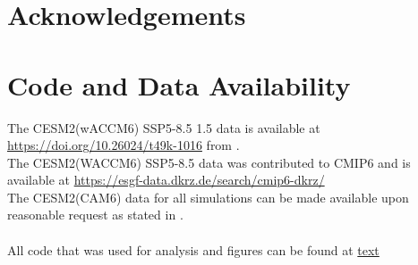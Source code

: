 \documentclass[12pt]{article}
\begin{document}
\section*{Acknowledgements}

\newpage

\printbibliography
{}

\section*{Code and Data Availability}
The CESM2(wACCM6) SSP5-8.5 1.5 data is available at \href{https://doi.org/10.26024/t49k-1016}{https://doi.org/10.26024/t49k-1016} from \textcite{tilmes2020}.\\
The CESM2(WACCM6) SSP5-8.5 data was contributed to CMIP6 and is available at \href{https://esgf-data.dkrz.de/search/cmip6-dkrz/}{https://esgf-data.dkrz.de/search/cmip6-dkrz/}\\
The CESM2(CAM6) data for all simulations can be made available upon reasonable request as stated in \textcite{pfluger2024}.\\\\

All code that was used for analysis and figures can be found at \href{URL}{text}

\newpage
\appendix

\end{document}
